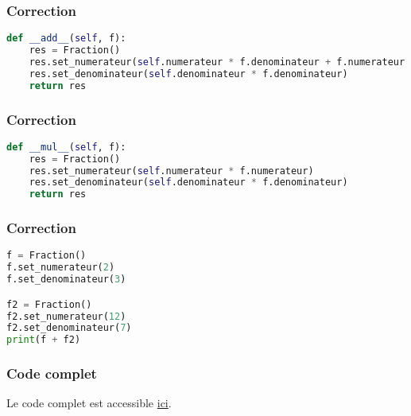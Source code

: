 \documentclass[svgnames,11pt]{beamer}
\begin{document}
\begin{frame}[fragile]
    \frametitle{Correction}

\begin{center}
\begin{lstlisting}[language=Python , basicstyle=\ttfamily\small, xleftmargin=2em, xrightmargin=1em]
def __add__(self, f):
    res = Fraction()
    res.set_numerateur(self.numerateur * f.denominateur + f.numerateur * self.denominateur)
    res.set_denominateur(self.denominateur * f.denominateur)
    return res
\end{lstlisting}
\label{CODE}
\end{center}   

\end{frame}
\begin{frame}[fragile]
    \frametitle{Correction}

\begin{center}
\begin{lstlisting}[language=Python , basicstyle=\ttfamily\small, xleftmargin=2em, xrightmargin=1em]
def __mul__(self, f):
    res = Fraction()
    res.set_numerateur(self.numerateur * f.numerateur)
    res.set_denominateur(self.denominateur * f.denominateur)
    return res
\end{lstlisting}
\label{CODE}
\end{center}

\end{frame}
\begin{frame}[fragile]
    \frametitle{Correction}

\begin{center}
\begin{lstlisting}[language=Python , basicstyle=\ttfamily\small, xleftmargin=2em, xrightmargin=1em]
f = Fraction()
f.set_numerateur(2)
f.set_denominateur(3)

f2 = Fraction()
f2.set_numerateur(12)
f2.set_denominateur(7)
print(f + f2)
\end{lstlisting}
\label{CODE}
\end{center}

\end{frame}

\begin{frame}
    \frametitle{Code complet}

    Le code complet est accessible \href{https://cviroulaud.github.io/terminale/langages/paradigmes/POO/tp-fraction/scripts/fraction-correction.zip}{ici}.

\end{frame}
\end{document}
